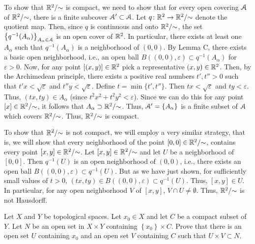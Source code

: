 \begin{solution}
  To show that $\mathbb{R}^2/{\sim}$ is compact, we need to show that for every
  open covering $\mathcal{A}$ of $\mathbb{R}^2/{\sim}$, there is a finite subcover
  $\mathcal{A}'\subset\mathcal{A}$. Let $q\colon\mathbb{R}^2\to\mathbb{R}^2/{\sim}$ denote the
  quotient map. Then, since $q$ is continuous and onto $\mathbb{R}^2/{\sim}$, the
  set $\left\{q^{-1}(A_\alpha)\right\}_{A_\alpha\in\mathcal{A}}$ is an open cover
  of $\mathbb{R}^2$. In particular, there exists at least one $A_\alpha$ such
  that $q^{-1}(A_\alpha)$ is a neighborhood of $(0,0)$. By Lemma C, there
  exists a basic open neighborhood, i.e., an open ball
  $B((0,0),\varepsilon)\subset q^{-1}(A_\alpha)$ for $\varepsilon>0$. Now,
  for any point $[(x,y)]\in\mathbb{R}^2$ pick a representative
  $(x,y)\in\mathbb{R}^2$. Then, by the Archimedean principle, there exists a
  positive real numbers $t',t''>0$ such that $t'x<\sqrt{\varepsilon}$ and
  $t''y<\sqrt{\varepsilon}$. Define $t=\min\{t',t''\}$. Then
  $tx<\sqrt{\varepsilon}$ and $ty<\varepsilon$. Thus, $(tx,ty)\in A_\alpha$
  (since $t^2x^2+t^2y^2<\varepsilon$). Since we can do this for any point
  $[x]\in\mathbb{R}^2/{\sim}$, it follows that
  $A_\alpha\supset\mathbb{R}^2/{\sim}$. Thus, $\mathcal{A}'=\left\{A_\alpha\right\}$ is
  a finite subset of $\mathcal{A}$ which covers $\mathbb{R}^2/{\sim}$. Thus,
  $\mathbb{R}^2/{\sim}$ is compact.

  To show that $\mathbb{R}^2/{\sim}$ is not compact, we will employ a very
  similar strategy, that is, we will show that every neighborhood of the
  point $[0,0]\in\mathbb{R}^2/{\sim}$, contains every point
  $[x,y]\in\mathbb{R}^2/{\sim}$. Let $[x,y]\in\mathbb{R}^2/{\sim}$ and let $U$ be a
  neighborhood of $[0,0]$. Then $q^{-1}(U)$ is an open neighborhood of
  $(0,0)$, i.e., there exists an open ball
  $B((0,0),\varepsilon)\subset q^{-1}(U)$. But as we have just shown, for
  sufficiently small values of $t>0$,
  $(tx,ty)\in B((0,0),\varepsilon)\subset q^{-1}(U)$. Thus, $[x,y]\in
  U$. In particular, for any open neighborhood $V$ of $[x,y]$,
  $V\cap U\neq\emptyset$. Thus, $\mathbb{R}^2/{\sim}$ is not Hausdorff.
\end{solution}
\begin{problem}
  Let $X$ and $Y$ be topological spaces. Let $x_0\in X$ and let $C$ be a
  compact subset of $Y$. Let $N$ be an open set in $X\times Y$ containing
  $\left\{x_0\right\}\times C$. Prove that there is an open set $U$
  containing $x_0$ and an open set $V$ containing $C$ such that
  $U\times V\subset N$.
\end{problem}
